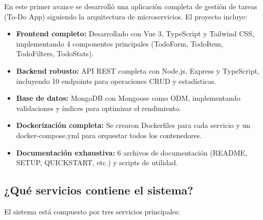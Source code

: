\documentclass[12pt,a4paper]{article}
\begin{document}
En este primer avance se desarrolló una aplicación completa de gestión de tareas (To-Do App) siguiendo la arquitectura de microservicios. El proyecto incluye:

\begin{itemize}
    \item \textbf{Frontend completo:} Desarrollado con Vue 3, TypeScript y Tailwind CSS, implementando 4 componentes principales (TodoForm, TodoItem, TodoFilters, TodoStats).
    
    \item \textbf{Backend robusto:} API REST completa con Node.js, Express y TypeScript, incluyendo 10 endpoints para operaciones CRUD y estadísticas.
    
    \item \textbf{Base de datos:} MongoDB con Mongoose como ODM, implementando validaciones y índices para optimizar el rendimiento.
    
    \item \textbf{Dockerización completa:} Se crearon Dockerfiles para cada servicio y un docker-compose.yml para orquestar todos los contenedores.
    
    \item \textbf{Documentación exhaustiva:} 6 archivos de documentación (README, SETUP, QUICKSTART, etc.) y scripts de utilidad.
\end{itemize}

\subsection{¿Qué servicios contiene el sistema?}

El sistema está compuesto por tres servicios principales:
\end{document}
